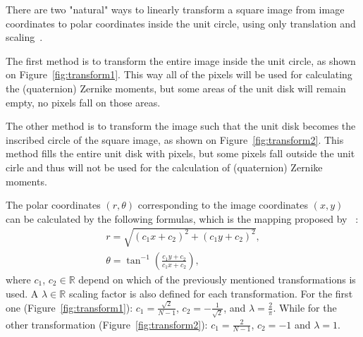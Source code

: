 There are two "natural" ways to linearly transform a square image from image coordinates to polar coordinates inside the unit circle, using only translation and scaling~\cite{kintner}.

The first method is to transform the entire image inside the unit circle, as shown on Figure~\ref{fig:transform1}. This way all of the pixels will be used for calculating the (quaternion) Zernike moments, but some areas of the unit disk will remain empty, no pixels fall on those areas.

The other method is to transform the image such that the unit disk becomes the inscribed circle of the square image, as shown on Figure~\ref{fig:transform2}. This method fills the entire unit disk with pixels, but some pixels fall outside the unit cirle and thus will not be used for the calculation of (quaternion) Zernike moments.

The polar coordinates $(r,\theta)$ corresponding to the image coordinates $(x,y)$ can be calculated by the following formulas, which is the mapping proposed by \citeauthor{Chong}~\cite{Chong}:
\begin{gather*}
  r = \sqrt{(c_1x + c_2)^2 + (c_1y + c_2)^2}, \\
  \theta = \tan^{-1}\left(\frac{c_1y + c_2}{c_1x + c_2}\right),
\end{gather*}
where $c_1$, $c_2 \in \mathds{R}$ depend on which of the previously mentioned transformations is used. A $\lambda \in \mathds{R}$ scaling factor is also defined for each transformation.
For the first one (Figure~\ref{fig:transform1}): $c_1 = \frac{\sqrt{2}}{N - 1}$, $c_2 = -\frac{1}{\sqrt{2}}$, and $\lambda = \frac{2}{\pi}$. While for the other transformation (Figure~\ref{fig:transform2}): $c_1 = \frac{2}{N - 1}$, $c_2 = -1$ and $\lambda = 1$.

